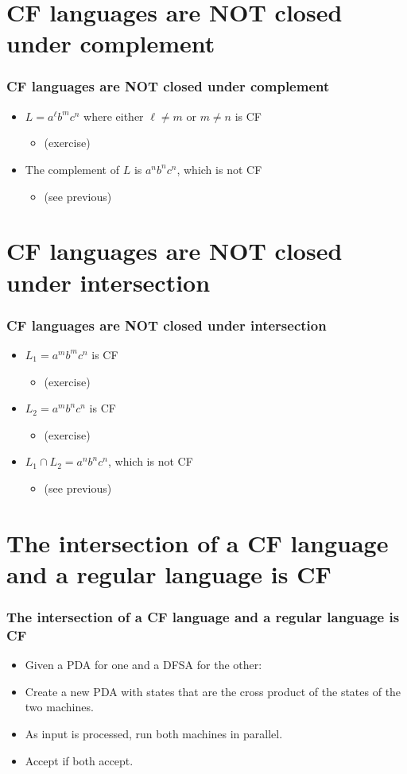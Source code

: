 \documentclass{beamer}
\newcommand{\bi}{\begin{itemize}}
\newcommand{\li}{\item}
\newcommand{\ei}{\end{itemize}}
\newcommand{\sect}[1]{
\section{#1}
\begin{frame}[fragile]\frametitle{#1}
}
\begin{document}
\sect{CF languages are NOT closed under complement}
\bi
\li $L = a^\ell b^m c^n$ where either $\ell \not = m$ or $m \not = n$ is
CF 
\bi \li (exercise) \ei
\li The complement of $L$ is $a^nb^nc^n$, which is not CF
\bi \li (see previous) \ei
\ei
\end{frame}

\sect{CF languages are NOT closed under intersection}
\bi
\li $L_1 = a^mb^mc^n$ is CF 
\bi \li (exercise) \ei
\li $L_2 = a^mb^nc^n$ is CF 
\bi \li (exercise) \ei
\li $L_1 \cap L_2 = a^nb^nc^n$, which is not CF
\bi \li (see previous) \ei
\ei
\end{frame}

\sect{The intersection of a CF language and a regular language is CF}
\bi
\li Given a PDA for one and a DFSA for the other:
\li Create a new PDA with states that are the cross product of the
states of the two machines.
\li As input is processed, run both machines in parallel.
\li Accept if both accept.
\ei
\end{frame}
\end{document}

